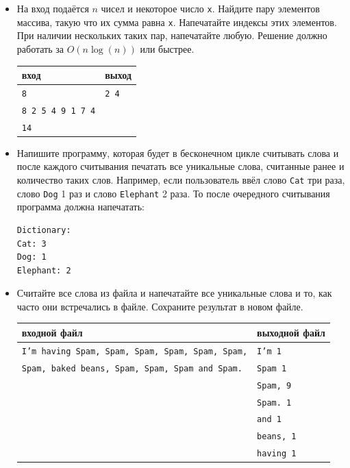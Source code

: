 \documentclass{article}
\begin{document}
\begin{itemize}
\item На вход подаётся $n$ чисел и некоторое число \texttt{x}. Найдите пару элементов массива, такую что их сумма равна \texttt{x}. Напечатайте индексы этих элементов. При наличии нескольких таких пар, напечатайте любую. Решение должно работать за $O(n \log(n))$ или быстрее.
\begin{center}
\begin{tabular}{ l | l }
 вход & выход \\ \hline
 \texttt{8} & \texttt{2 4}  \\ 
 \texttt{8 2 5 4 9 1 7 4} &  \\
 \texttt{14} &  \\
\end{tabular}
\end{center}

\item Напишите программу, которая будет в бесконечном цикле считывать слова и после каждого считывания печатать все уникальные слова, считанные ранее и количество таких слов. Например, если пользователь ввёл слово \texttt{Cat} три раза, слово \texttt{Dog} 1 раз и слово \texttt{Elephant} 2 раза. То после очередного считывания программа должна напечатать:
\begin{verbatim}
Dictionary:
Cat: 3
Dog: 1
Elephant: 2
\end{verbatim}
\item Считайте все слова из файла и напечатайте все уникальные слова и то, как часто они встречались в файле. Сохраните результат в новом файле.
\begin{center}
\begin{tabular}{ l | l }
 входной файл & выходной файл \\ \hline
 \texttt{I'm having Spam, Spam, Spam, Spam, Spam, Spam,} & \texttt{I'm 1}  \\
 \texttt{Spam, baked beans, Spam, Spam, Spam and Spam.}  &  \texttt{Spam 1}  \\
                                                         &  \texttt{Spam, 9}  \\ 
                                                         &  \texttt{Spam. 1}  \\ 
                                                         &  \texttt{and 1}  \\ 
                                                         &  \texttt{beans, 1}  \\ 
                                                         &  \texttt{having 1}  \\                                                      
\end{tabular}
\end{center}
\end{itemize}
\end{document}
